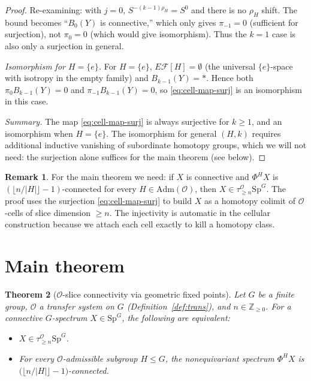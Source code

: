 \documentclass[12pt]{article}
\newtheorem{theorem}{Theorem}
\theoremstyle{definition}
\newtheorem{remark}[theorem]{Remark}
\newcommand{\SpG}{\mathrm{Sp}^{G}}
\newcommand{\PhiH}{\Phi^{H}}
\newcommand{\OO}{\mathcal{O}}
\newcommand{\ZZ}{\mathbb{Z}}
\newcommand{\admis}{\mathrm{Adm}}
\newcommand{\Esub}[1]{E\mathcal{F}[#1]}
\begin{document}
\begin{proof}
Re-examining: with $j=0$, $S^{-(k-1)\rho_{H}}=S^{0}$ and there is no $\rho_{H}$
shift. The bound becomes ``$B_{0}(Y)$ is connective,'' which only gives
$\pi_{-1}=0$ (sufficient for surjection), not $\pi_{0}=0$ (which would give
isomorphism). Thus the $k=1$ case is also only a surjection in general.

\smallskip
\emph{Isomorphism for $H=\{e\}$.} For $H=\{e\}$, $\Esub{H}=\emptyset$ (the
universal $\{e\}$-space with isotropy in the empty family) and
$B_{k-1}(Y)=\ast$. Hence both $\pi_{0}B_{k-1}(Y)=0$ and
$\pi_{-1}B_{k-1}(Y)=0$, so \eqref{eq:cell-map-surj} is an isomorphism in this
case.

\smallskip
\emph{Summary.} The map \eqref{eq:cell-map-surj} is always surjective for
$k\geq 1$, and an isomorphism when $H=\{e\}$. The isomorphism for general
$(H,k)$ requires additional inductive vanishing of subordinate homotopy
groups, which we will not need: the surjection alone suffices for the
main theorem (see below).
\end{proof}

\begin{remark}\label{rem:surj-suffices}
For the main theorem we need: if $X$ is connective and $\PhiH X$ is
$(\lfloor n/|H|\rfloor-1)$-connected for every $H\in\admis(\OO)$, then
$X\in\tau_{\geq n}^{\OO}\SpG$. The proof uses the surjection
\eqref{eq:cell-map-surj} to build $X$ as a homotopy colimit of $\OO$-cells of
slice dimension $\geq n$. The injectivity is automatic in the cellular
construction because we attach each cell exactly to kill a homotopy class.
\end{remark}

\section{Main theorem}\label{sec:main}

\begin{theorem}[$\OO$-slice connectivity via geometric fixed points]
\label{thm:main}
Let $G$ be a finite group, $\OO$ a transfer system on $G$
(Definition~\ref{def:trans}), and $n\in\ZZ_{\geq 0}$. For a connective
$G$-spectrum $X\in\SpG$, the following are equivalent:
\begin{itemize}
\item[\textup{(i)}] $X\in\tau_{\geq n}^{\OO}\SpG$.
\item[\textup{(ii)}] For every $\OO$-admissible subgroup $H\leq G$, the
nonequivariant spectrum $\PhiH X$ is $\bigl(\lfloor n/|H|\rfloor-1\bigr)$-connected.
\end{itemize}
\end{theorem}
\end{document}
